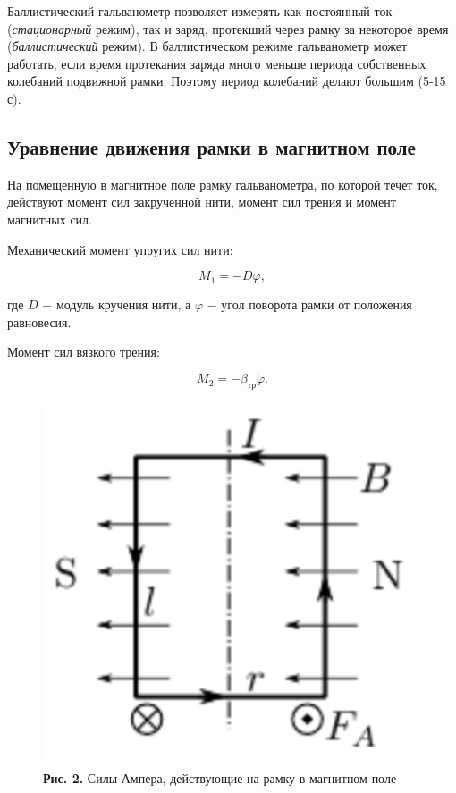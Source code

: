 \documentclass[a4paper,12pt]{article} %
\begin{document}
\hfill \break Баллистический гальванометр позволяет измерять как постоянный ток (\textit{стационарный} режим), так и заряд, протекший через рамку за некоторое время (\textit{баллистический} режим). В баллистическом режиме гальванометр может работать, если время протекания заряда много меньше периода собственных колебаний подвижной рамки. Поэтому период колебаний делают большим (5-15 с).

\subsection{Уравнение движения рамки в магнитном поле}
\hfill \break На помещенную в магнитное поле рамку гальванометра, по которой течет ток, действуют момент сил закрученной нити, момент сил трения и момент магнитных сил.

\hfill \break Механический момент упругих сил нити:

\begin{equation}\label{ linkname }
M_{1} = -D\varphi,
\end{equation}

\hfill \break где $D$ $-$ модуль кручения нити, а $\varphi$ $-$ угол поворота рамки от положения равновесия.

\hfill \break Момент сил вязкого трения:

\begin{equation}\label{ linkname }
M_{2} = -\beta_\text{тр}\dot\varphi.
\end{equation}

\begin{figure}
\begin{center}
    \includegraphics[width=1\textwidth]{3.2.6_2.png}
    \textbf{Рис. 2.} Силы Ампера, действующие на рамку в магнитном поле
\end{center}
\end{figure}
\end{document}
